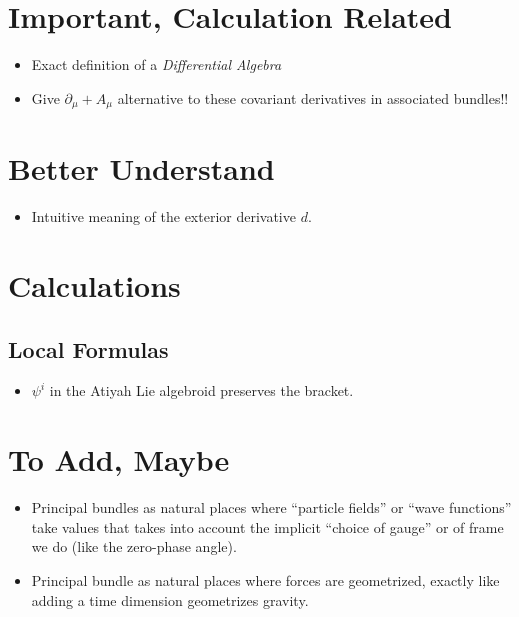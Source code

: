 \section{Important, Calculation Related}

\begin{itemize}
    \item Exact definition of a \emph{Differential Algebra}
    
    \item Give $\partial_\mu + A_\mu$ alternative to these covariant derivatives in associated bundles!!
\end{itemize}

\section{Better Understand}

\begin{itemize}
    \item Intuitive meaning of the exterior derivative $d$.
\end{itemize}

\section{Calculations}

\subsection{Local Formulas}
\begin{itemize}
    \item $\psi^i$ in the Atiyah Lie algebroid preserves the bracket.
\end{itemize}

\section{To Add, Maybe}
\begin{itemize}
    \item Principal bundles as natural places where ``particle fields'' or ``wave functions'' take values that takes into account the implicit ``choice of gauge'' or of frame we do (like the zero-phase angle).
    
    \item Principal bundle as natural places where forces are geometrized, exactly like adding a time dimension geometrizes gravity. 
\end{itemize}